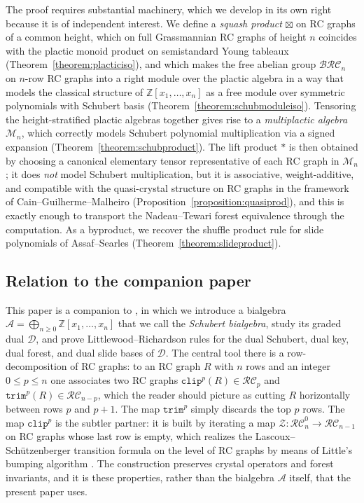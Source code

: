\documentclass{amsart}
\theoremstyle{definition}
\theoremstyle{remark}
\numberwithin{equation}{subsection}
\newcommand{\trm}{\mathtt{trim}}
\newcommand{\zeromap}{\mathcal{Z}}
\newcommand{\clp}{\mathtt{clip}}
\newcommand{\BRC}{\mathcal{BRC}}
\newcommand{\RC}{\mathcal{RC}}
\newcommand{\coma}{\mathcal{A}}
\newcommand{\dcoma}{\mathcal{D}}
\begin{document}
The proof requires substantial machinery, which we develop in its own right because it is of independent interest. We define a \emph{squash product} $\boxtimes$ on RC graphs of a common height, which on full Grassmannian RC graphs of height $n$ coincides with the plactic monoid product on semistandard Young tableaux (Theorem~\ref{theorem:placticiso}), and which makes the free abelian group $\BRC_n$ on $n$-row RC graphs into a right module over the plactic algebra in a way that models the classical structure of $\mathbb{Z}[x_1,\ldots,x_n]$ as a free module over symmetric polynomials with Schubert basis (Theorem~\ref{theorem:schubmoduleiso}). Tensoring the height-stratified plactic algebras together gives rise to a \emph{multiplactic algebra} $\mathcal{M}_n$, which correctly models Schubert polynomial multiplication via a signed expansion (Theorem~\ref{theorem:schubproduct}). The lift product $*$ is then obtained by choosing a canonical elementary tensor representative of each RC graph in $\mathcal{M}_n$; it does \emph{not} model Schubert multiplication, but it is associative, weight-additive, and compatible with the quasi-crystal structure on RC graphs in the framework of Cain--Guilherme--Malheiro \cite{cain2023quasicrystals} (Proposition~\ref{proposition:quasiprod}), and this is exactly enough to transport the Nadeau--Tewari forest equivalence through the computation. As a byproduct, we recover the shuffle product rule for slide polynomials of Assaf--Searles \cite{assaf2017slide} (Theorem~\ref{theorem:slideproduct}).

\subsection*{Relation to the companion paper}

This paper is a companion to \cite{samuelbialgebra}, in which we introduce a bialgebra $\coma=\bigoplus_{n\geq 0}\mathbb{Z}[x_1,\ldots,x_n]$ that we call the \emph{Schubert bialgebra}, study its graded dual $\dcoma$, and prove Littlewood--Richardson rules for the dual Schubert, dual key, dual forest, and dual slide bases of $\dcoma$. The central tool there is a row-decomposition of RC graphs: to an RC graph $R$ with $n$ rows and an integer $0\leq p\leq n$ one associates two RC graphs $\clp^p(R)\in\RC_p$ and $\trm^p(R)\in\RC_{n-p}$, which the reader should picture as cutting $R$ horizontally between rows $p$ and $p+1$. The map $\trm^p$ simply discards the top $p$ rows. The map $\clp^p$ is the subtler partner: it is built by iterating a map $\zeromap:\RC_n^0\to\RC_{n-1}$ on RC graphs whose last row is empty, which realizes the Lascoux--Sch\"utzenberger transition formula on the level of RC graphs by means of Little's bumping algorithm \cite{little2003combinatorial}. The construction preserves crystal operators and forest invariants, and it is these properties, rather than the bialgebra $\coma$ itself, that the present paper uses.
\end{document}
